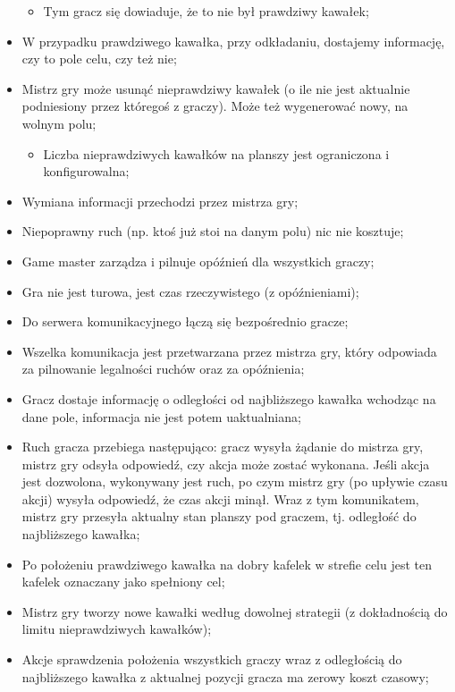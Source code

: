 \documentclass[a4paper]{article}
\begin{document}
\begin{itemize}
  \begin{itemize}
  \item
    Tym gracz się dowiaduje, że to nie był prawdziwy kawałek;
  \end{itemize}
\item
  W przypadku prawdziwego kawałka, przy odkładaniu, dostajemy informację, czy to pole celu, czy też nie;
\item
  Mistrz gry może usunąć nieprawdziwy kawałek (o ile nie jest aktualnie podniesiony przez któregoś z graczy). Może też wygenerować nowy, na wolnym polu;

  \begin{itemize}
  \item
    Liczba nieprawdziwych kawałków na planszy jest ograniczona i konfigurowalna;
  \end{itemize}
\item
  Wymiana informacji przechodzi przez mistrza gry;
\item
  Niepoprawny ruch (np. ktoś już stoi na danym polu) nic nie kosztuje;
\item
  Game master zarządza i pilnuje opóźnień dla wszystkich graczy;
\item
  Gra nie jest turowa, jest czas rzeczywistego (z opóźnieniami);
\item
  Do serwera komunikacyjnego łączą się bezpośrednio gracze;
\item
  Wszelka komunikacja jest przetwarzana przez mistrza gry, który odpowiada za pilnowanie legalności ruchów oraz za opóźnienia;
\item
  Gracz dostaje informację o odległości od najbliższego kawałka wchodząc na dane pole, informacja nie jest potem uaktualniana;
\item
  Ruch gracza przebiega następująco: gracz wysyła żądanie do mistrza gry, mistrz gry odsyła odpowiedź, czy akcja może zostać wykonana. Jeśli akcja jest dozwolona, wykonywany jest ruch, po czym mistrz gry (po upływie czasu akcji) wysyła odpowiedź, że czas akcji minął. Wraz z tym komunikatem, mistrz gry przesyła aktualny stan planszy pod graczem, tj. odległość do najbliższego kawałka;
\item
  Po położeniu prawdziwego kawałka na dobry kafelek w strefie celu jest ten kafelek oznaczany jako spełniony cel;
\item
  Mistrz gry tworzy nowe kawałki według dowolnej strategii (z dokładnością do limitu nieprawdziwych kawałków);
\item
  Akcje sprawdzenia położenia wszystkich graczy wraz z odległością do najbliższego kawałka z aktualnej pozycji gracza ma zerowy koszt czasowy;

\end{itemize}
\end{document}
